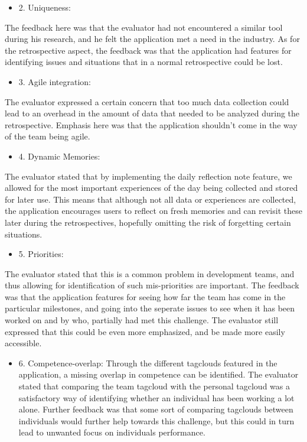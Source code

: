 \begin{itemize}
    \item 2. Uniqueness: 
\end{itemize}
The feedback here was that the evaluator had not encountered a similar tool during his research, and he felt the application met a need in the industry. As for the retrospective aspect, the feedback was that the application had features for identifying issues and situations that in a normal retrospective could be lost.  

\begin{itemize}
    \item 3. Agile integration: 
\end{itemize}
The evaluator expressed a certain concern that too much data collection could lead to an overhead in the amount of data that needed to be analyzed during the retrospective. Emphasis here was that the application shouldn't come in the way of the team being agile. 

\begin{itemize}
    \item 4. Dynamic Memories:
\end{itemize}
 The evaluator stated that by implementing the daily reflection note feature, we allowed for the most important experiences of the day being collected and stored for later use. This means that although not all data or experiences are collected, the application encourages users to reflect on fresh memories and can revisit these later during the retrospectives, hopefully omitting the risk of forgetting certain situations. 

\begin{itemize}
    \item 5. Priorities: 
\end{itemize}
The evaluator stated that this is a common problem in development teams, and thus allowing for identification of such mis-priorities are important. The feedback was that the application features for seeing how far the team has come in the particular milestones, and going into the seperate issues to see when it has been worked on and by who, partially had met this challenge. The evaluator still expressed that this could be even more emphasized, and be made more easily accessible. 

\begin{itemize}
    \item 6. Competence-overlap: Through the different tagclouds featured in the application, a missing overlap in competence can be identified. The evaluator stated that comparing the team tagcloud with the personal tagcloud was a satisfactory way of identifying whether an individual has been working a lot alone. Further feedback was that some sort of comparing tagclouds between individuals would further help towards this challenge, but this could in turn lead to unwanted focus on individuals performance. 
\end{itemize}

